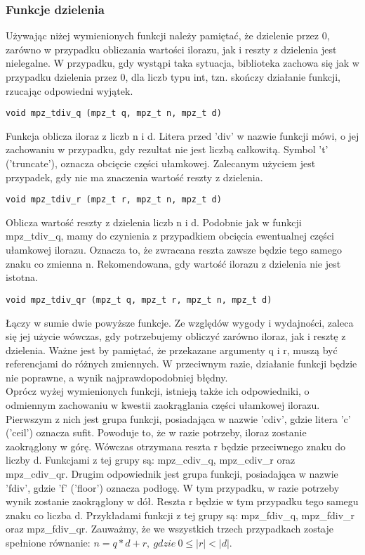 \documentclass[twoside,a4paper]{book}
\begin{document}
\subsubsection{Funkcje dzielenia}
Używając niżej wymienionych funkcji należy pamiętać, że dzielenie przez 0, zarówno w przypadku obliczania wartości ilorazu, jak i reszty z dzielenia jest nielegalne. W przypadku, gdy wystąpi taka sytuacja, biblioteka zachowa się jak w przypadku dzielenia przez 0, dla liczb typu int, tzn. skończy działanie funkcji, rzucając odpowiedni wyjątek.

\begin{lstlisting}
void mpz_tdiv_q (mpz_t q, mpz_t n, mpz_t d)
\end{lstlisting}

Funkcja oblicza iloraz z liczb n i d. Litera przed 'div' w nazwie funkcji mówi, o jej zachowaniu w przypadku, gdy rezultat nie jest liczbą całkowitą. Symbol 't' ('truncate'), oznacza obcięcie części ułamkowej. Zalecanym użyciem jest przypadek, gdy nie ma znaczenia wartość reszty z dzielenia.

\begin{lstlisting}
void mpz_tdiv_r (mpz_t r, mpz_t n, mpz_t d)
\end{lstlisting}

Oblicza wartość reszty z dzielenia liczb n i d. Podobnie jak w funkcji mpz\_tdiv\_q, mamy do czynienia z przypadkiem obcięcia ewentualnej części ułamkowej ilorazu. Oznacza to, że zwracana reszta zawsze będzie tego samego znaku co zmienna n. Rekomendowana, gdy wartość ilorazu z dzielenia nie jest istotna.

\begin{lstlisting}
void mpz_tdiv_qr (mpz_t q, mpz_t r, mpz_t n, mpz_t d)
\end{lstlisting}

Łączy w sumie dwie powyższe funkcje. Ze względów wygody i wydajności, zaleca się jej użycie wówczas, gdy potrzebujemy obliczyć zarówno iloraz, jak i resztę z dzielenia. Ważne jest by pamiętać, że przekazane argumenty q i r, muszą być referencjami do różnych zmiennych. W przeciwnym razie, działanie funkcji będzie nie poprawne, a wynik najprawdopodobniej błędny.\\
Oprócz wyżej wymienionych funkcji, istnieją także ich odpowiedniki, o odmiennym zachowaniu w kwestii zaokrąglania części ułamkowej ilorazu. Pierwszym z nich jest grupa funkcji, posiadająca w nazwie 'cdiv', gdzie litera 'c' ('ceil') oznacza sufit. Powoduje to, że w razie potrzeby, iloraz zostanie zaokrąglony w górę. Wówczas otrzymana reszta r będzie przeciwnego znaku do liczby d. Funkcjami z tej grupy są: mpz\_cdiv\_q, mpz\_cdiv\_r oraz mpz\_cdiv\_qr. Drugim odpowiednik jest grupa funkcji, posiadająca w nazwie 'fdiv', gdzie 'f' ('floor') oznacza podłogę. W tym przypadku, w razie potrzeby wynik zostanie zaokrąglony w dół. Reszta r będzie w tym przypadku tego samegu znaku co liczba d. Przykładami funkcji z tej grupy są: mpz\_fdiv\_q, mpz\_fdiv\_r oraz mpz\_fdiv\_qr. Zauważmy, że we wszystkich trzech przypadkach zostaje spełnione równanie: $n = q*d+r,\ gdzie\ 0 \le |r| < |d|.$
\end{document}
